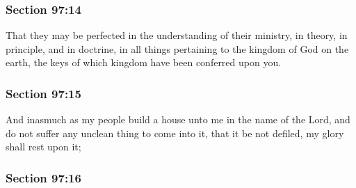
	\subsubsection{Section 97:14} %
		\label{DC97-14}

		That they may be perfected in the understanding of their ministry, in theory, in principle, and in doctrine, in all things pertaining to the kingdom of God on the earth, the keys of which kingdom have been conferred upon you.


	\subsubsection{Section 97:15} %
		\label{DC97-15}

		And inasmuch as my people build a house unto me in the name of the Lord, and do not suffer any unclean thing to come into it, that it be not defiled, my glory shall rest upon it;


	\subsubsection{Section 97:16} %
		\label{DC97-16}

